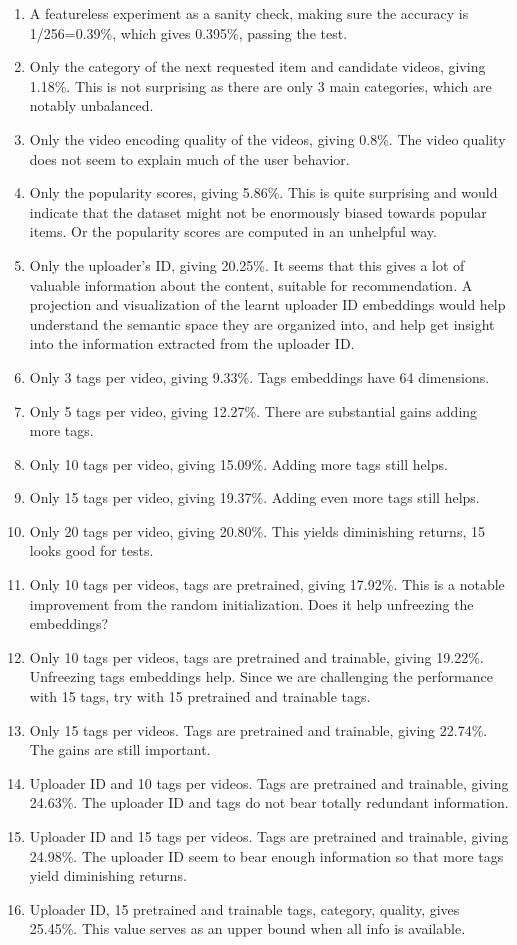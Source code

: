 \begin{enumerate}
    \item A featureless experiment as a sanity check, making sure the accuracy is 1/256=0.39\%, which gives 0.395\%, passing the test.
    \item Only the category of the next requested item and candidate videos, giving 1.18\%. This is not surprising as there are only 3 main categories, which are notably unbalanced.
    \item Only the video encoding quality of the videos, giving 0.8\%. The video quality does not seem to explain much of the user behavior.
    \item Only the popularity scores, giving 5.86\%. This is quite surprising and would indicate that the dataset might not be enormously biased towards popular items. Or the popularity scores are computed in an unhelpful way.
    \item Only the uploader's ID, giving 20.25\%. It seems that this gives a lot of valuable information about the content, suitable for recommendation. A projection and visualization of the learnt uploader ID embeddings would help understand the semantic space they are organized into, and help get insight into the information extracted from the uploader ID.
    \item Only 3 tags per video, giving 9.33\%. Tags embeddings have 64 dimensions.
    \item Only 5 tags per video, giving 12.27\%. There are substantial gains adding more tags.
    \item Only 10 tags per video, giving 15.09\%. Adding more tags still helps.
    \item Only 15 tags per video, giving 19.37\%. Adding even more tags still helps.
    \item Only 20 tags per video, giving 20.80\%. This yields diminishing returns, 15 looks good for tests.
    \item Only 10 tags per videos, tags are pretrained, giving 17.92\%. This is a notable improvement from the random initialization. Does it help unfreezing the embeddings?
    \item Only 10 tags per videos, tags are pretrained and trainable, giving 19.22\%. Unfreezing tags embeddings help. Since we are challenging the performance with 15 tags, try with 15 pretrained and trainable tags.
    \item Only 15 tags per videos. Tags are pretrained and trainable, giving 22.74\%. The gains are still important.
    \item Uploader ID and 10 tags per videos. Tags are pretrained and trainable, giving 24.63\%. The uploader ID and tags do not bear totally redundant information.
    \item Uploader ID and 15 tags per videos. Tags are pretrained and trainable, giving 24.98\%. The uploader ID seem to bear enough information so that more tags yield diminishing returns.
    \item Uploader ID, 15 pretrained and trainable tags, category, quality, gives 25.45\%. This value serves as an upper bound when all info is available.
\end{enumerate}

